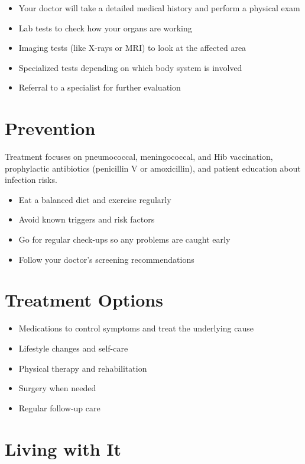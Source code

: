 \begin{itemize}[noitemsep]
  \item Your doctor will take a detailed medical history and perform a physical exam
  \item Lab tests to check how your organs are working
  \item Imaging tests (like X-rays or MRI) to look at the affected area
  \item Specialized tests depending on which body system is involved
  \item Referral to a specialist for further evaluation
\end{itemize}

\section{Prevention}
Treatment focuses on pneumococcal, meningococcal, and Hib vaccination, prophylactic antibiotics (penicillin V or amoxicillin), and patient education about infection risks.

\begin{itemize}[noitemsep]
  \item Eat a balanced diet and exercise regularly
  \item Avoid known triggers and risk factors
  \item Go for regular check-ups so any problems are caught early
  \item Follow your doctor's screening recommendations
\end{itemize}

\section{Treatment Options}

\begin{itemize}[noitemsep]
  \item Medications to control symptoms and treat the underlying cause
  \item Lifestyle changes and self-care
  \item Physical therapy and rehabilitation
  \item Surgery when needed
  \item Regular follow-up care
\end{itemize}

\section{Living with It}

